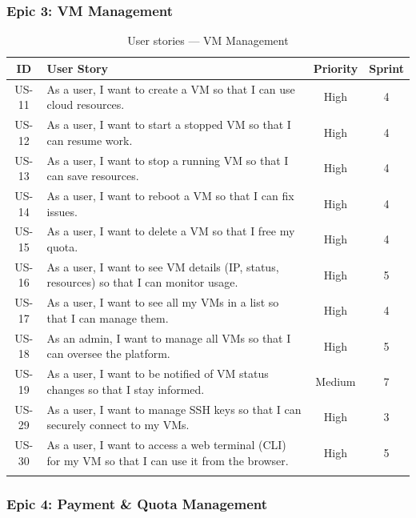 \subsubsection{Epic 3: VM Management}

\begin{longtable}{|c|p{7cm}|c|c|}
\hline
\rowcolor{blue!15}
\textbf{ID} & \textbf{User Story} & \textbf{Priority} & \textbf{Sprint} \\
\hline
\endhead
US-11 & As a user, I want to create a VM so that I can use cloud resources. & High & 4 \\
\hline
US-12 & As a user, I want to start a stopped VM so that I can resume work. & High & 4 \\
\hline
US-13 & As a user, I want to stop a running VM so that I can save resources. & High & 4 \\
\hline
US-14 & As a user, I want to reboot a VM so that I can fix issues. & High & 4 \\
\hline
US-15 & As a user, I want to delete a VM so that I free my quota. & High & 4 \\
\hline
US-16 & As a user, I want to see VM details (IP, status, resources) so that I can monitor usage. & High & 5 \\
\hline
US-17 & As a user, I want to see all my VMs in a list so that I can manage them. & High & 4 \\
\hline
US-18 & As an admin, I want to manage all VMs so that I can oversee the platform. & High & 5 \\
\hline
US-19 & As a user, I want to be notified of VM status changes so that I stay informed. & Medium & 7 \\
\hline
US-29 & As a user, I want to manage SSH keys so that I can securely connect to my VMs. & High & 3 \\
\hline
US-30 & As a user, I want to access a web terminal (CLI) for my VM so that I can use it from the browser. & High & 5 \\
\hline
\caption{User stories — VM Management}
\label{tab:us-vm}
\end{longtable}

\subsubsection{Epic 4: Payment \& Quota Management}

